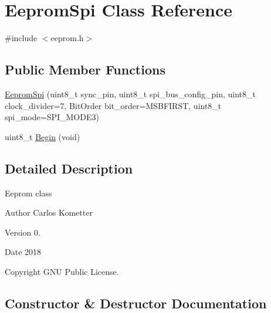 \hypertarget{classEepromSpi}{}\section{Eeprom\+Spi Class Reference}
\label{classEepromSpi}


{\ttfamily \#include $<$eeprom.\+h$>$}

\subsection*{Public Member Functions}
\begin{DoxyCompactItemize}
\item 
\mbox{\hyperlink{classEepromSpi_ac8220a867620c54fe4f653c67fba0ba3}{Eeprom\+Spi}} (uint8\+\_\+t sync\+\_\+pin, uint8\+\_\+t spi\+\_\+bus\+\_\+config\+\_\+pin, uint8\+\_\+t clock\+\_\+divider=7, Bit\+Order bit\+\_\+order=M\+S\+B\+F\+I\+R\+ST, uint8\+\_\+t spi\+\_\+mode=S\+P\+I\+\_\+\+M\+O\+D\+E3)
\item 
uint8\+\_\+t \mbox{\hyperlink{classEepromSpi_a73b7f850103cacbcefbab5c7422a8928}{Begin}} (void)
\end{DoxyCompactItemize}


\subsection{Detailed Description}
Eeprom class \begin{DoxyAuthor}{Author}
Carlos Kometter 
\end{DoxyAuthor}
\begin{DoxyVersion}{Version}
0. 
\end{DoxyVersion}
\begin{DoxyDate}{Date}
2018 
\end{DoxyDate}
\begin{DoxyCopyright}{Copyright}
G\+NU Public License. 
\end{DoxyCopyright}


\subsection{Constructor \& Destructor Documentation}
\mbox{\label{classEepromSpi_ac8220a867620c54fe4f653c67fba0ba3}} 
